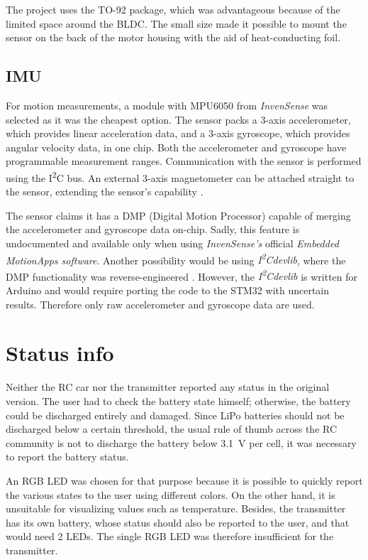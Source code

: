 The project uses the TO-92 package, which was advantageous because of the limited space around the BLDC. The small size made it possible to mount the sensor on the back of the motor housing with the aid of heat-conducting foil.

\subsection{IMU}			%
For motion measurements, a module with MPU6050 from \textit{InvenSense} was selected as it was the cheapest option. The sensor packs a 3-axis accelerometer, which provides linear acceleration data, and a 3-axis gyroscope, which provides angular velocity data, in one chip. Both the accelerometer and gyroscope have programmable measurement ranges. Communication with the sensor is performed using the I\textsuperscript{2}C bus. An external 3-axis magnetometer can be attached straight to the sensor, extending the sensor's capability \cite{mpu_datasheet}.

The sensor claims it has a DMP (Digital Motion Processor) capable of merging the accelerometer and gyroscope data on-chip. Sadly, this feature is undocumented and available only when using \textit{InvenSense's} official \textit{Embedded MotionApps software}. Another possibility would be using \textit{I\textsuperscript{2}Cdevlib}, where the DMP functionality was reverse-engineered \cite{i2cdevlib}. However, the \textit{I\textsuperscript{2}Cdevlib} is written for Arduino and would require porting the code to the STM32 with uncertain results. Therefore only raw accelerometer and gyroscope data are used.

\section{Status info}
\label{sec:hw_status}
Neither the RC car nor the transmitter reported any status in the original version. The user had to check the battery state himself; otherwise, the battery could be discharged entirely and damaged. Since LiPo batteries should not be discharged below a certain threshold, the usual rule of thumb across the RC community is not to discharge the battery below \SI{3.1}{\V} per cell, it was necessary to report the battery status.

An RGB LED was chosen for that purpose because it is possible to quickly report the various states to the user using different colors. On the other hand, it is unsuitable for visualizing values such as temperature. Besides, the transmitter has its own battery, whose status should also be reported to the user, and that would need 2 LEDs. The single RGB LED was therefore insufficient for the transmitter.

